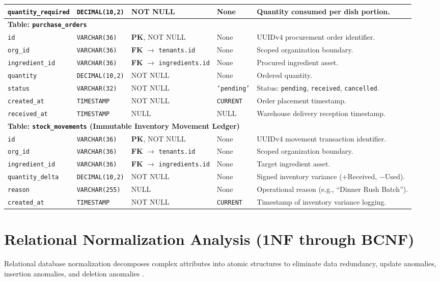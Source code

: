 \begin{table}[htbp]
\begin{tabularx}{\textwidth}{llp{3.2cm}lX}
\texttt{quantity\_required}& \texttt{DECIMAL(10,2)}& NOT NULL & None & Quantity consumed per dish portion. \\
\midrule
\multicolumn{5}{l}{\textbf{Table: \texttt{purchase\_orders}}} \\
\texttt{id} & \texttt{VARCHAR(36)} & \textbf{PK}, NOT NULL & None & UUIDv4 procurement order identifier. \\
\texttt{org\_id} & \texttt{VARCHAR(36)} & \textbf{FK} $\to$ \texttt{tenants.id} & None & Scoped organization boundary. \\
\texttt{ingredient\_id}& \texttt{VARCHAR(36)}& \textbf{FK} $\to$ \texttt{ingredients.id}& None & Procured ingredient asset. \\
\texttt{quantity} & \texttt{DECIMAL(10,2)}& NOT NULL & None & Ordered quantity. \\
\texttt{status} & \texttt{VARCHAR(32)} & NOT NULL & \texttt{'pending'} & Status: \texttt{pending}, \texttt{received}, \texttt{cancelled}. \\
\texttt{created\_at} & \texttt{TIMESTAMP} & NOT NULL & \texttt{CURRENT} & Order placement timestamp. \\
\texttt{received\_at} & \texttt{TIMESTAMP} & NULL & NULL & Warehouse delivery reception timestamp. \\
\midrule
\multicolumn{5}{l}{\textbf{Table: \texttt{stock\_movements} (Immutable Inventory Movement Ledger)}} \\
\texttt{id} & \texttt{VARCHAR(36)} & \textbf{PK}, NOT NULL & None & UUIDv4 movement transaction identifier. \\
\texttt{org\_id} & \texttt{VARCHAR(36)} & \textbf{FK} $\to$ \texttt{tenants.id} & None & Scoped organization boundary. \\
\texttt{ingredient\_id}& \texttt{VARCHAR(36)}& \textbf{FK} $\to$ \texttt{ingredients.id}& None & Target ingredient asset. \\
\texttt{quantity\_delta}& \texttt{DECIMAL(10,2)}& NOT NULL & None & Signed inventory variance ($+$Received, $-$Used). \\
\texttt{reason} & \texttt{VARCHAR(255)} & NULL & None & Operational reason (e.g., ``Dinner Rush Batch''). \\
\texttt{created\_at} & \texttt{TIMESTAMP} & NOT NULL & \texttt{CURRENT} & Timestamp of inventory variance logging. \\
\bottomrule
\end{tabularx}
\end{table}

\section{Relational Normalization Analysis (1NF through BCNF)}
\label{sec:db_normalization}
Relational database normalization decomposes complex attributes into atomic structures to eliminate data redundancy, update anomalies, insertion anomalies, and deletion anomalies \parencite{codd1970relational, date2004introduction}.


